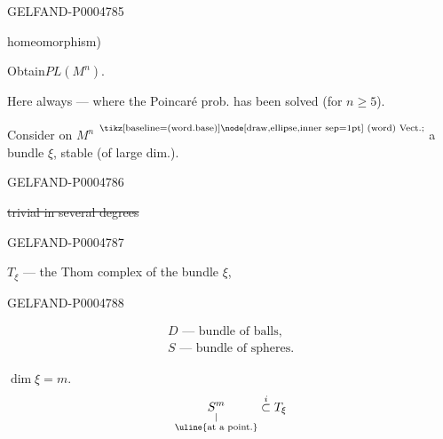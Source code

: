 \begin{GelfandAdjacentEvidence}{GELFAND-P000478}{5}

homeomorphism)

Obtain\quad $PL(M^n)$.

Here always\quad{}
— where the Poincaré prob. has been solved (for $n\geqslant5$).

Consider on $M^n$
\(\overset{\text{\scriptsize\tikz[baseline=(word.base)]\node[draw,ellipse,inner sep=1pt] (word) {Vect.};}}{\vphantom{x}}\)
a bundle $\xi$, stable (of large dim.).
\end{GelfandAdjacentEvidence}
\begin{GelfandAdjacentEvidence}{GELFAND-P000478}{6}


\sout{trivial in several degrees}
\end{GelfandAdjacentEvidence}
\begin{GelfandAdjacentEvidence}{GELFAND-P000478}{7}


$T_\xi$ — the Thom complex of the bundle $\xi$,
\end{GelfandAdjacentEvidence}
\begin{GelfandAdjacentEvidence}{GELFAND-P000478}{8}

\[
\begin{gathered}
D\text{ — bundle of balls},\\
S\text{ — bundle of spheres}.
\end{gathered}
\]

$\dim\xi=m$.
\[
\underset{\substack{\vert\\ \text{\uline{at a point.}}}}{S^m}
 \overset{i}{\subset}T_\xi
\]
\end{GelfandAdjacentEvidence}
